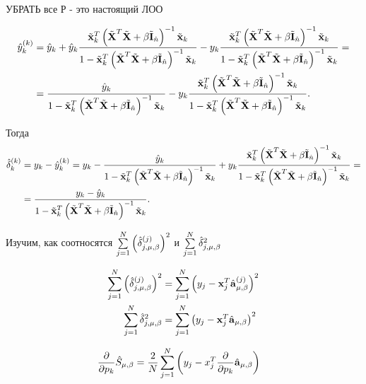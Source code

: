 УБРАТЬ все Р - это настоящий ЛОО

\begin{align}
	\hat y\this_k
		&= \hat y_k + \hat y_k\frac{\tilde{\mb x}_k^T\inv{\A} \tilde{\mb x}_k}{\denominator}
		- y_k\frac{\tilde{\mb x}^T_k\inv{\A}\tilde{\mb x}_k}{\denominator} = \\
		&= \frac{\hat y_k}{\denominator} - y_k\frac{\tilde{\mb x}^T_k\inv{\A}\tilde{\mb x}_k}{\denominator}.
\end{align}

Тогда
\begin{align}
	\hat{\delta}_k\this
	&= y_k - \hat y\this_k = y_k - \frac{\hat y_k}{\denominator} + y_k\frac{\tilde{\mb x}^T_k\inv{\A}\tilde{\mb x}_k}{\denominator} = \\
	&= \frac{y_k - \hat y_k}{\denominator}.
\end{align}

Изучим, как соотносятся
$\suml_{j=1}^N\sqr{\hat{\delta}_{j, \lams}^{(j)}}$
и $\suml_{j=1}^N \hat\delta_{j, \lams}^2$

\begin{align}
	\suml_{j=1}^N\sqr{\hat{\delta}_{j, \lams}^{(j)}} &=
		\suml_{j=1}^N\sqr{y_j - \mb x_j^T \hat {\mb a}_\lams^{(j)}} \\
	\suml_{j=1}^N \hat\delta_{j, \lams}^2 &=
		\suml_{j=1}^N \sqr{y_j - \mb x_j^T \hat {\mb a}_\lams}
\end{align}


\begin{align}
	\dd{}{p_k}\hat{S}_{\lams}&= \frac2N\sum_{j=1}^N\cbr{y_j - x_j^T \dd{}{p_k}\hat {\mb a}_{\lams}}
\end{align}
